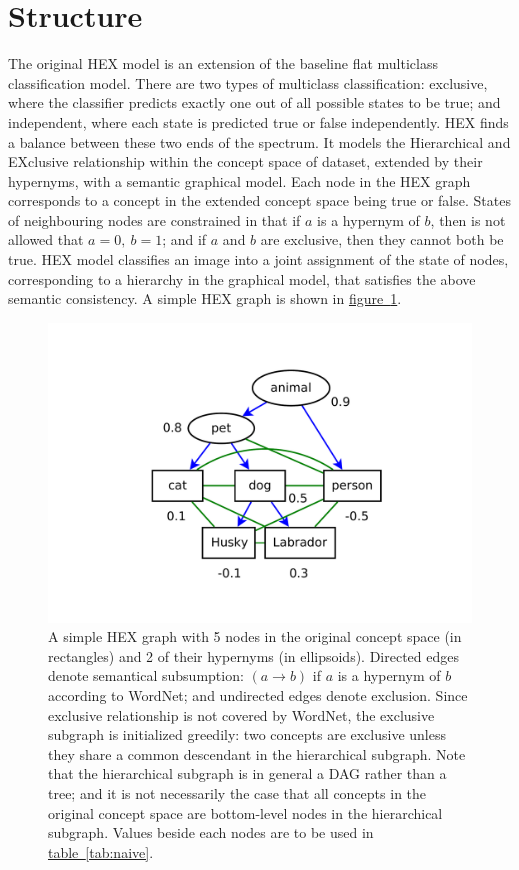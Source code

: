 \documentclass[11pt,a4paper]{book}
\begin{document}
\section{Structure}

The original HEX model \cite{deng2014large} is an extension of the baseline flat multiclass classification model. There are two types of multiclass classification: exclusive, where the classifier predicts exactly one out of all possible states to be true; and independent, where each state is predicted true or false independently. HEX finds a balance between these two ends of the spectrum. It models the Hierarchical and EXclusive relationship within the concept space of dataset, extended by their hypernyms, with a semantic graphical model. Each node in the HEX graph corresponds to a concept in the extended concept space being true or false. States of neighbouring nodes are constrained in that if $a$ is a hypernym of $b$, then is not allowed that $a=0,\ b=1$; and if $a$ and $b$ are exclusive, then they cannot both be true. HEX model classifies an image into a joint assignment of the state of nodes, corresponding to a hierarchy in the graphical model, that satisfies the above semantic consistency. A simple HEX graph is shown in \hyperref[fig:naive]{figure~\ref{fig:naive}}.
\begin{figure}[htbp]
\centering
\includegraphics[scale=0.5]{naive.pdf}
\caption{A simple HEX graph with 5 nodes in the original concept space (in rectangles) and 2 of their hypernyms (in ellipsoids). Directed edges denote semantical subsumption: $(a\rightarrow b)$ if $a$ is a hypernym of $b$ according to WordNet; and undirected edges denote exclusion. Since exclusive relationship is not covered by WordNet, the exclusive subgraph is initialized greedily: two concepts are exclusive unless they share a common descendant in the hierarchical subgraph. Note that the hierarchical subgraph is in general a DAG rather than a tree; and it is not necessarily the case that all concepts in the original concept space are bottom-level nodes in the hierarchical subgraph. Values beside each nodes are to be used in \hyperref[tab:naive]{table~\ref{tab:naive}}.}
\label{fig:naive}
\end{figure}
\end{document}
